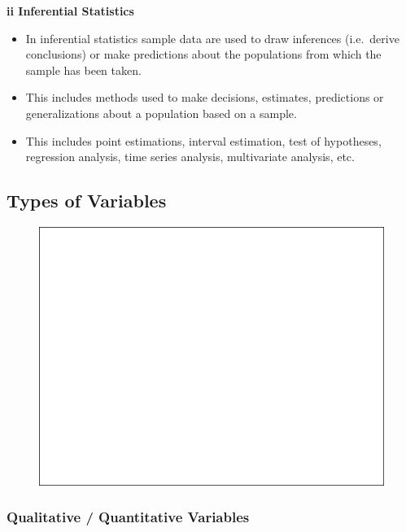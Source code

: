 \documentclass[]{book}
\providecommand{\tightlist}{%
  \setlength{\itemsep}{0pt}\setlength{\parskip}{0pt}}
\begin{document}
\textbf{ii Inferential Statistics}

\begin{itemize}
\tightlist
\item
  In inferential statistics sample data are used to draw inferences (i.e.~derive conclusions) or make predictions about the populations from which the sample has been taken.
\item
  This includes methods used to make decisions, estimates, predictions or generalizations about a population based on a sample.
\item
  This includes point estimations, interval estimation, test of hypotheses, regression analysis, time series analysis, multivariate analysis, etc.
\end{itemize}

\hypertarget{types-of-variables}{%
\subsection{Types of Variables}\label{types-of-variables}}

\begin{figure}

{\centering \includegraphics[width=1\linewidth]{figure/box2-1} 

}

\end{figure}

\hypertarget{qualitative-quantitative-variables}{%
\subsubsection{Qualitative / Quantitative Variables}\label{qualitative-quantitative-variables}}
\end{document}
